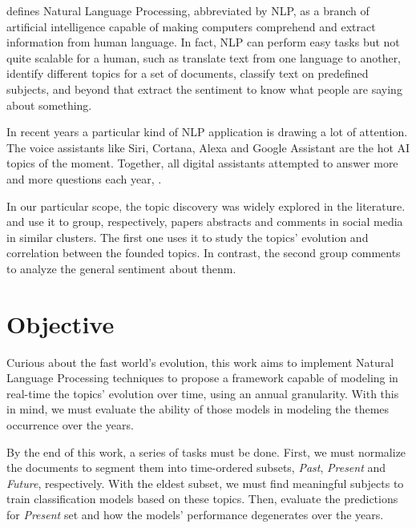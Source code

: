  defines Natural Language Processing, abbreviated by NLP, as a branch of artificial intelligence capable of making computers comprehend and extract information from human language.
In fact, NLP can perform easy tasks but not quite scalable for a human, such as translate text from one language to another, identify different topics for a set of documents, classify text on predefined subjects, and beyond that extract the sentiment to know what people are saying about something.

In recent years a particular kind of NLP application is drawing a lot of attention. The voice assistants like Siri, Cortana, Alexa and Google Assistant are the hot AI topics of the moment. Together, all digital assistants attempted to answer more and more questions each year, \cite{kailakrayewski2019}.

\newpage
In our particular scope, the topic discovery was widely explored in the literature.  and  use it to group, respectively, papers abstracts and comments in social media in similar clusters. The first one uses it to study the topics' evolution and correlation between the founded topics. In contrast, the second group comments to analyze the general sentiment about thenm.


\section{Objective}


Curious about the fast world's evolution, this work aims to implement Natural Language Processing techniques to propose a framework capable of modeling in real-time the topics' evolution over time, using an annual granularity. 
With this in mind, we must evaluate the ability of those models in modeling the themes occurrence over the years.

By the end of this work, a series of tasks must be done. First, we must normalize the documents to segment them into time-ordered subsets, \textit{Past}, \textit{Present} and \textit{Future}, respectively. With the eldest subset, we must find meaningful subjects to train classification models based on these topics. Then, evaluate the predictions for \textit{Present} set and how the models' performance degenerates over the years.

